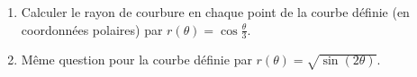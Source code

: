 \begin{exercice}\label{exoCourbesSurfaces0013}

	\begin{enumerate}
\item
	Calculer le rayon de courbure en chaque point de la courbe définie (en coordonnées polaires) par $r (\theta) = \cos \frac{\theta}{3}$.

\item
Même question pour la courbe définie par $r  (\theta) = \sqrt{\sin (2 \theta)}$.
			
	\end{enumerate}


\end{exercice}
